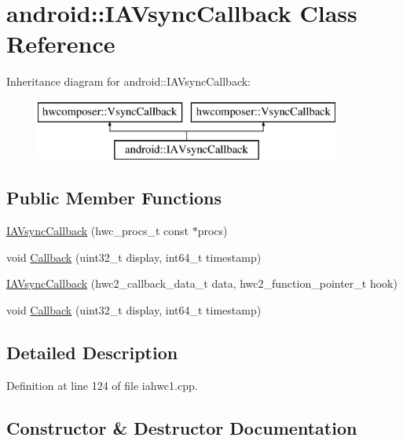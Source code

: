 \hypertarget{classandroid_1_1IAVsyncCallback}{}\section{android\+:\+:I\+A\+Vsync\+Callback Class Reference}
\label{classandroid_1_1IAVsyncCallback}
Inheritance diagram for android\+:\+:I\+A\+Vsync\+Callback\+:\begin{figure}[H]
\begin{center}
\leavevmode
\includegraphics[height=2.000000cm]{classandroid_1_1IAVsyncCallback}
\end{center}
\end{figure}
\subsection*{Public Member Functions}
\begin{DoxyCompactItemize}
\item 
\mbox{\hyperlink{classandroid_1_1IAVsyncCallback_a32db4a2123be74e0a801392871bfe48d}{I\+A\+Vsync\+Callback}} (hwc\+\_\+procs\+\_\+t const $\ast$procs)
\item 
void \mbox{\hyperlink{classandroid_1_1IAVsyncCallback_ab5d04e5b2c2c36fc58639bbd9867cb54}{Callback}} (uint32\+\_\+t display, int64\+\_\+t timestamp)
\item 
\mbox{\hyperlink{classandroid_1_1IAVsyncCallback_a52e1c4e87b7667af7d10a94079785716}{I\+A\+Vsync\+Callback}} (hwc2\+\_\+callback\+\_\+data\+\_\+t data, hwc2\+\_\+function\+\_\+pointer\+\_\+t hook)
\item 
void \mbox{\hyperlink{classandroid_1_1IAVsyncCallback_ab5d04e5b2c2c36fc58639bbd9867cb54}{Callback}} (uint32\+\_\+t display, int64\+\_\+t timestamp)
\end{DoxyCompactItemize}


\subsection{Detailed Description}


Definition at line 124 of file iahwc1.\+cpp.



\subsection{Constructor \& Destructor Documentation}
\mbox{\label{classandroid_1_1IAVsyncCallback_a32db4a2123be74e0a801392871bfe48d}} 
